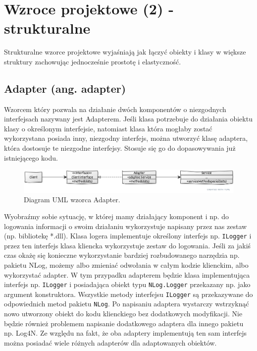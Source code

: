 \section{Wzroce projektowe (2) - strukturalne}

Strukturalne wzorce projektowe wyjaśniają jak łączyć obiekty i klasy w większe struktury zachowując jednocześnie prostotę i elastyczność.

\subsection{Adapter (ang. adapter)}\label{sec/lab3/adapter}

Wzorcem który pozwala na działanie dwóch komponentów o niezgodnych interfejsach nazywany jest Adapterem. Jeśli klasa potrzebuje do działania obiektu klasy o określonym interfejsie, natomiast klasa która mogłaby zostać wykorzystana posiada inny, niezgodny interfejs, można utworzyć klasę adaptera, która dostosuje te niezgodne interfejsy. Stosuje się go do dopasowywania już istniejącego kodu.

\begin{figure}[hbt!]
	\centering
	\includegraphics[width=0.9\linewidth]{images/AdapterUml}
	\caption{Diagram UML wzorca Adapter.}
	\label{lab3/fig/AdapterUml}
\end{figure}
%

Wyobraźmy sobie sytuację, w której mamy działający komponent i np. do logowania informacji o swoim działaniu wykorzystuje napisany przez nas zestaw (np. bibliotekę *.dll). Klasa logera implementuje określony interfejs np. \texttt{ILogger} i przez ten interfejs klasa kliencka wykorzystuje zestaw do logowania. Jeśli za jakiś czas okażę się konieczne wykorzystanie bardziej rozbudowanego narzędzia np. pakietu NLog, możemy albo zmieniać odwołania w całym kodzie klienckim, albo wykorzystać adapter. W tym przypadku adapterem będzie klasa implementująca interfejs np. \texttt{ILogger} i posiadająca obiekt typu \texttt{NLog.Logger} przekazany np. jako argument konstruktora. Wszystkie metody interfejsu \texttt{ILogger} są przekazywane do odpowiednich metod pakietu \texttt{NLog}. Po napisaniu adaptera wystarczy wstrzyknąć nowo utworzony obiekt do kodu klienckiego bez dodatkowych modyfikacji. Nie będzie również problemem napisanie dodatkowego adaptera dla innego pakietu np. Log4N. Ze względu na fakt, że oba adaptery implementują ten sam interfejs można posiadać wiele różnych adapterów dla adaptowanych obiektów.

